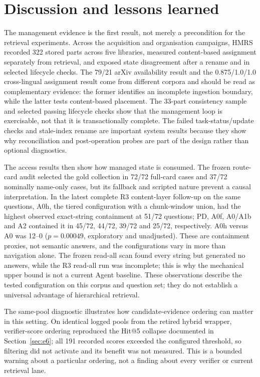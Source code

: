 \section{Discussion and lessons learned}
\label{sec:discussion}

The management evidence is the first result, not merely a precondition for the
retrieval experiments. Across the acquisition and organisation campaigns, HMRS
recorded 322 stored parts across five libraries, measured content-based
assignment separately from retrieval, and exposed state disagreement after a
rename and in selected lifecycle checks. The 79/21 arXiv availability result
and the 0.875/1.0/1.0 cross-lingual assignment result come from different
corpora and should be read as complementary evidence: the former identifies an
incomplete ingestion boundary, while the latter tests content-based placement.
The 33-part consistency sample and selected passing lifecycle checks show
that the management loop is exercisable, not that it is transactionally
complete. The failed task-status/update checks and stale-index rename are
important system results because they show why reconciliation and post-operation
probes are part of the design rather than optional diagnostics.

The access results then show how managed state is consumed. The frozen route-card
audit selected the gold collection in 72/72 full-card cases and 37/72 nominally
name-only cases, but its fallback and scripted nature prevent a causal
interpretation. In the latest complete R3 content-layer follow-up on the same
questions, A0h, the tiered configuration with a chunk-window union, had the highest observed exact-string
containment at 51/72 questions; PD, A0f, A0/A1b and A2 contained it in
45/72, 44/72, 39/72 and 25/72, respectively. A0h versus A0 was 12--0
($p=0.00049$, exploratory and unadjusted). These are containment proxies, not
semantic answers, and the configurations vary in more than navigation alone.
The frozen read-all scan found every string but generated no answers, while the
R3 read-all run was incomplete; this is why the mechanical upper bound is not a
current Agent baseline. These observations describe the tested configuration
on this corpus and question set; they do not establish a universal advantage of hierarchical
retrieval.

The same-pool diagnostic illustrates how candidate-evidence ordering can matter
in this setting. On identical logged pools from the retired hybrid wrapper,
verifier-score ordering reproduced the Hit@5 collapse documented in
Section~\ref{sec:e6}; all 191 recorded scores exceeded the configured
threshold, so filtering did not activate and its benefit was not measured.
This is a bounded warning about a particular ordering, not a finding about
every verifier or current retrieval lane.

